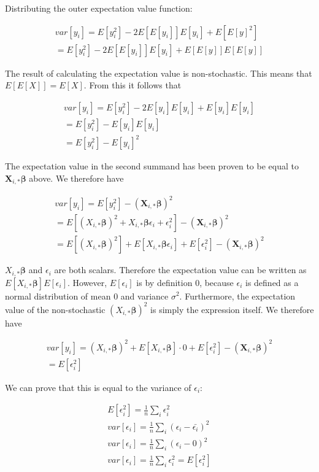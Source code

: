 \documentclass[twocolumn,10pt,cleanfoot]{asme2ej}
\begin{document}
Distributing the outer expectation value function:

\begin{gather}
var[y_i] = E[y_i^2] - 2E\left[E[y_i]\right]E[y_i] + E\left[E[y]^2\right]  \\
= E[y_i^2] - 2E\left[E[y_i]\right]E[y_i] + E\left[E[y]\right]E\left[E[y]\right]
\end{gather}

The result of calculating the expectation value is non-stochastic. This means that $E[E[X]] = E[X]$. From this it follows that

\begin{gather}
var[y_i] = E[y_i^2] - 2E[y_i]E[y_i] + E[y_i]E[y_i]  \\
= E[y_i^2] - E[y_i]E[y_i]  \\
= E[y_i^2] - E[y_i]^2
\end{gather}

The expectation value in the second summand has been proven to be equal to $\bm{X}_{i,*}\bm{\beta}$ above. We therefore have

\begin{gather}
var[y_i] = E[y_i^2] - (\bm{X}_{i,*}\bm{\beta})^2  \\
= E\left[(X_{i,*}\bm{\beta})^2 + X_{i,*}\bm{\beta}\epsilon_i + \epsilon_i^2\right] - (\bm{X}_{i,*}\bm{\beta})^2  \\
= E\left[(X_{i,*}\bm{\beta})^2\right] + E[X_{i,*}\bm{\beta}\epsilon_i] + E[\epsilon_i^2] - (\bm{X}_{i,*}\bm{\beta})^2
\end{gather}

$X_{i,*}\bm{\beta}$ and $\epsilon_i$ are both scalars. Therefore the expectation value can be written as $E[X_{i,*}\bm{\beta}]E[\epsilon_i]$. However, $E[\epsilon_i]$ is by definition $0$, because $\epsilon_i$ is defined as a normal distribution of mean $0$ and variance $\sigma^2$. Furthermore, the expectation value of the non-stochastic $(X_{i,*}\bm{\beta})^2$ is simply the expression itself. We therefore have

\begin{gather}
var[y_i] = (X_{i,*}\bm{\beta})^2 + E[X_{i,*}\bm{\beta}]\cdot 0 + E[\epsilon_i^2] - (\bm{X}_{i,*}\bm{\beta})^2  \\
= E[\epsilon_i^2]
\end{gather}

We can prove that this is equal to the variance of $\epsilon_i$:

\begin{gather}
E[\epsilon_i^2] = \frac{1}{n} \sum_i \epsilon_i^2 \\
var[\epsilon_i] = \frac{1}{n} \sum_i (\epsilon_i - \bar{\epsilon_i})^2 \\
var[\epsilon_i] = \frac{1}{n} \sum_i (\epsilon_i - 0)^2 \\
var[\epsilon_i] = \frac{1}{n} \sum_i \epsilon_i^2 = E[\epsilon_i^2]
\end{gather}
\end{document}
